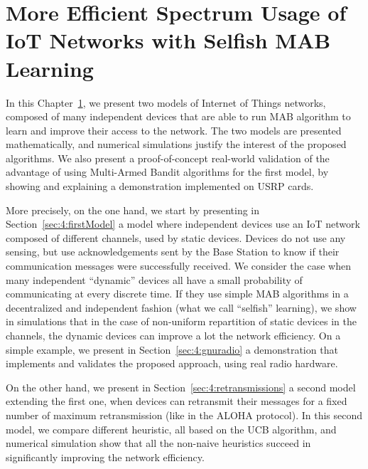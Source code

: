 
\chapter{More Efficient Spectrum Usage of IoT Networks with Selfish MAB Learning}
\label{chapter:4}
\minitoc

In this Chapter~\ref{chapter:4}, we present two models of Internet of Things networks, composed of many independent devices that are able to run MAB algorithm to learn and improve their access to the network.
The two models are presented mathematically, and numerical simulations justify the interest of the proposed algorithms.
We also present a proof-of-concept real-world validation of the advantage of using Multi-Armed Bandit algorithms for the first model, by showing and explaining a demonstration implemented on USRP \cite{USRPDocumentation} cards.

More precisely, on the one hand, we start by presenting in Section~\ref{sec:4:firstModel} a model where independent devices use an IoT network composed of different channels, used by static devices.
Devices do not use any sensing, but use acknowledgements sent by the Base Station to know if their communication messages were successfully received.
We consider the case when many independent ``dynamic'' devices all have a small probability of communicating at every discrete time. If they use simple MAB algorithms in a decentralized and independent fashion (what we call ``selfish'' learning),
we show in simulations that in the case of non-uniform repartition of static devices in the channels, the dynamic devices can improve a lot the network efficiency.
%
On a simple example, we present in Section~\ref{sec:4:gnuradio} a demonstration that implements and validates the proposed approach, using real radio hardware.

On the other hand, we present in Section~\ref{sec:4:retransmissions} a second model extending the first one, when devices can retransmit their messages for a fixed number of maximum retransmission (like in the ALOHA protocol).
In this second model, we compare different heuristic, all based on the UCB algorithm, and numerical simulation show that all the non-naive heuristics succeed in significantly improving the network efficiency.

\newpage
\graphicspath{{2-Chapters/4-Chapter/Images/}}




